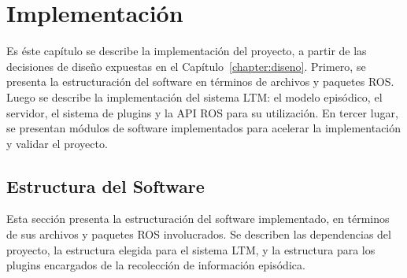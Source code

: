 \chapter{Implementación}\label{chapter:implementacion}

Es éste capítulo se describe la implementación del proyecto, a partir de las decisiones de diseño expuestas en el Capítulo~\ref{chapter:diseno}. Primero, se presenta la estructuración del software en términos de archivos y paquetes ROS. Luego se describe la implementación del sistema LTM: el modelo episódico, el servidor, el sistema de plugins y la API ROS para su utilización. En tercer lugar, se presentan módulos de software implementados para acelerar la implementación y validar el proyecto.




\section{Estructura del Software}

Esta sección presenta la estructuración del software implementado, en términos de sus archivos y paquetes ROS involucrados. Se describen las dependencias del proyecto, la estructura elegida para el sistema LTM, y la estructura para los plugins encargados de la recolección de información episódica.

